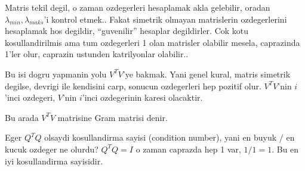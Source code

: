 \documentclass[12pt,fleqn]{article}\usepackage{../common}
\begin{document}
Matris tekil degil, o zaman ozdegerleri hesaplamak akla gelebilir,
oradan $\lambda_{min}, \lambda_{maks}$'i kontrol etmek.. Fakat simetrik
olmayan matrislerin ozdegerlerini hesaplamak hos degildir, ``guvenilir''
hesaplar degildirler. Cok kotu kosullandirilmis ama tum ozdegerleri 1 olan
matrisler olabilir mesela, caprazinda 1'ler olur, caprazin ustunden
katrilyonlar olabilir.. 

Bu isi dogru yapmanin yolu $V^TV$'ye bakmak. Yani genel kural, matris
simetrik degilse, devrigi ile kendisini carp, sonucun ozdegerleri hep
pozitif olur. $V^TV$'nin $i$'inci ozdegeri, $V$'nin $i$'inci ozdegerinin
karesi olacaktir. 

Bu arada $V^TV$ matrisine Gram matrisi denir. 

Eger $Q^TQ$ olsaydi kosullandirma sayisi (condition number), yani en buyuk /
en kucuk ozdeger ne olurdu? $Q^TQ = I$  o zaman caprazda hep 1 var, $1/1 =
1$. 
Bu en iyi kosullandirma sayisidir. 
\end{document}
